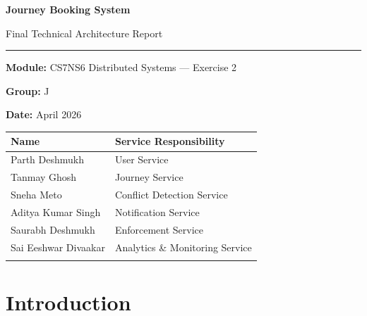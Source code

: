 \documentclass[12pt,a4paper]{article}
\begin{document}
\begin{titlepage}
  \centering
  \vspace*{2cm}
  {\LARGE\bfseries Journey Booking System\par}
  \vspace{0.4cm}
  {\Large Final Technical Architecture Report\par}
  \vspace{1.5cm}
  \rule{0.6\textwidth}{0.4pt}\par
  \vspace{0.8cm}
  {\large\textbf{Module:} CS7NS6 Distributed Systems --- Exercise 2\par}
  \vspace{0.3cm}
  {\large\textbf{Group:} J\par}
  \vspace{0.3cm}
  {\large\textbf{Date:} April 2026\par}
  \vspace{2cm}

  \begin{tabular}{m{4.5cm} m{6cm}}
    \toprule
    \textbf{Name} & \textbf{Service Responsibility} \\
    \midrule
    Parth Deshmukh         & User Service \\\addlinespace[0.4cm]
    Tanmay Ghosh           & Journey Service \\\addlinespace[0.4cm]
    Sneha Meto             & Conflict Detection Service \\\addlinespace[0.4cm]
    Aditya Kumar Singh     & Notification Service \\\addlinespace[0.4cm]
    Saurabh Deshmukh       & Enforcement Service \\\addlinespace[0.4cm]
    Sai Eeshwar Divaakar   & Analytics \& Monitoring Service \\\addlinespace[0.4cm]
    \bottomrule
  \end{tabular}
\end{titlepage}

\tableofcontents
\newpage

\section{Introduction}
\end{document}
